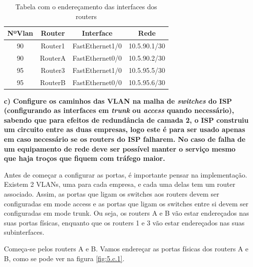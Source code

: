 \documentclass[11pt,english, openright, oneside]{book}
\begin{document}
\begin{table}[h!]
    \centering
    \begin{tabular}{|c|c|c|c|}
    \hline
        \textbf{NºVlan} & \textbf{Router} & \textbf{Interface} & \textbf{Rede}\\
    \hline
        90 & Router1 & FastEthernet1/0 & 10.5.90.1/30\\
        90 & RouterA & FastEthernet0/0 & 10.5.90.2/30\\
        95 & Router3 & FastEthernet1/0 & 10.5.95.5/30\\
        95 & RouterB & FastEthernet0/0 & 10.5.95.6/30\\
    \hline
    \end{tabular}
    \caption{Tabela com o endereçamento das interfaces dos routers}
    \label{tab:ipISP}
\end{table}
\vspace{0.2cm}

\vspace{0.8cm}

\textbf{c) Configure os caminhos das VLAN na malha de \textit{switches} do ISP
(configurando as interfaces em \textit{trunk} ou \textit{access} quando
necessário), sabendo que para efeitos de redundância de camada 2, o ISP
construiu um circuito entre as duas empresas, logo este é para ser usado apenas
em caso necessário se os routers do ISP falharem. No caso de falha de um
equipamento de rede deve ser possível manter o serviço mesmo que haja troços que
fiquem com tráfego maior.}
\vspace{0.2cm}

Antes de começar a configurar as portas, é importante pensar na implementação.
Existem 2 VLANs, uma para cada empresa, e cada uma delas tem um router
associado. Assim, as portas que ligam os switches aos routers devem ser
configuradas em mode access e as portas que ligam os switches entre si devem ser
configuradas em mode trunk. Ou seja, os routers A e B vão estar endereçados nas
suas portas físicas, enquanto que os routers 1 e 3 vão estar endereçados nas
suas subinterfaces.

\vspace{0.2cm}

Começa-se pelos routers A e B. Vamos endereçar as portas físicas dos routers A e
B, como se pode ver na figura \ref{fig:5.c.1}.
\end{document}

